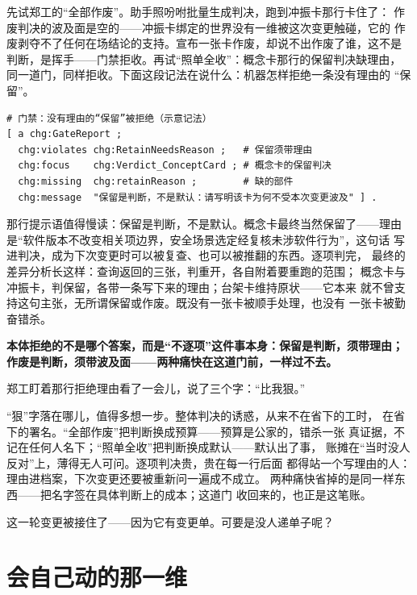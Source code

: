 先试郑工的“全部作废”。助手照吩咐批量生成判决，跑到冲振卡那行卡住了：
作废判决的波及面是空的——冲振卡绑定的世界没有一维被这次变更触碰，它的
作废剥夺不了任何在场结论的支持。宣布一张卡作废，却说不出作废了谁，这不是
判断，是挥手——门禁拒收。再试“照单全收”：概念卡那行的保留判决缺理由，
同一道门，同样拒收。下面这段记法在说什么：机器怎样拒绝一条没有理由的
“保留”。

\nopagebreak[4]
\begin{codebox}
\begin{Verbatim}[fontsize=\small,breaklines=true,breakanywhere=true,breaksymbolleft={},breaksymbolright={}]
# 门禁：没有理由的“保留”被拒绝（示意记法）
[ a chg:GateReport ;
  chg:violates chg:RetainNeedsReason ;   # 保留须带理由
  chg:focus    chg:Verdict_ConceptCard ; # 概念卡的保留判决
  chg:missing  chg:retainReason ;        # 缺的部件
  chg:message  "保留是判断，不是默认：请写明该卡为何不受本次变更波及" ] .
\end{Verbatim}
\end{codebox}

那行提示语值得慢读：保留是判断，不是默认。概念卡最终当然保留了——理由
是“软件版本不改变相关项边界，安全场景选定经复核未涉软件行为”，这句话
写进判决，成为下次变更时可以被复查、也可以被推翻的东西。逐项判完，
最终的差异分析长这样：查询返回的三张，判重开，各自附着要重跑的范围；
概念卡与冲振卡，判保留，各带一条写下来的理由；台架卡维持原状——它本来
就不曾支持这句主张，无所谓保留或作废。既没有一张卡被顺手处理，也没有
一张卡被勤奋错杀。

\textbf{本体拒绝的不是哪个答案，而是“不逐项”这件事本身：保留是判断，须带理由；作废是判断，须带波及面——两种痛快在这道门前，一样过不去。}

郑工盯着那行拒绝理由看了一会儿，说了三个字：“比我狠。”

“狠”字落在哪儿，值得多想一步。整体判决的诱惑，从来不在省下的工时，
在省下的署名。“全部作废”把判断换成预算——预算是公家的，错杀一张
真证据，不记在任何人名下；“照单全收”把判断换成默认——默认出了事，
账摊在“当时没人反对”上，薄得无人可问。逐项判决贵，贵在每一行后面
都得站一个写理由的人：理由进档案，下次变更还要被重新问一遍成不成立。
两种痛快省掉的是同一样东西——把名字签在具体判断上的成本；这道门
收回来的，也正是这笔账。

这一轮变更被接住了——因为它有变更单。可要是没人递单子呢？

\section{会自己动的那一维}

